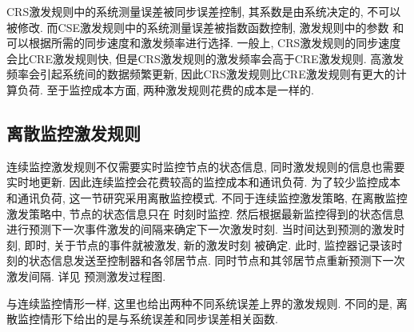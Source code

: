         \begin{rem}
           CRS激发规则中的系统测量误差被同步误差控制, 其系数是由系统决定的, 不可以被修改. 而CSE激发规则中的系统测量误差被指数函数控制, 激发规则中的参数 和 可以根据所需的同步速度和激发频率进行选择. 一般上, CRS激发规则的同步速度会比CRE激发规则快, 但是CRS激发规则的激发频率会高于CRE激发规则. 高激发频率会引起系统间的数据频繁更新, 因此CRS激发规则比CRE激发规则有更大的计算负荷. 至于监控成本方面, 两种激发规则花费的成本是一样的.
        \end{rem}

\subsection{离散监控激发规则}

        连续监控激发规则不仅需要实时监控节点的状态信息, 同时激发规则的信息也需要实时地更新. 因此连续监控会花费较高的监控成本和通讯负荷. 为了较少监控成本和通讯负荷, 这一节研究采用离散监控模式. 不同于连续监控激发策略, 在离散监控激发策略中, 节点的状态信息只在 时刻时监控. 然后根据最新监控得到的状态信息进行预测下一次事件激发的间隔来确定下一次激发时刻. 当时间达到预测的激发时刻, 即时, 关于节点的事件就被激发, 新的激发时刻 被确定. 此时, 监控器记录该时刻的状态信息发送至控制器和各邻居节点. 同时节点和其邻居节点重新预测下一次激发间隔. 详见 预测激发过程图.
        \begin{comment}[!htp]
        \setlength{\abovecaptionskip}{-1cm}
        \begin{center}
           {\texttt{[image: nonlinear/flowchartdec2.png]}}
        \end{center}
        \caption{离散监控下的预测激发过程图}\label{flowchart}
        \end{comment}

        与连续监控情形一样, 这里也给出两种不同系统误差上界的激发规则. 不同的是, 离散监控情形下给出的是与系统误差和同步误差相关函数.

